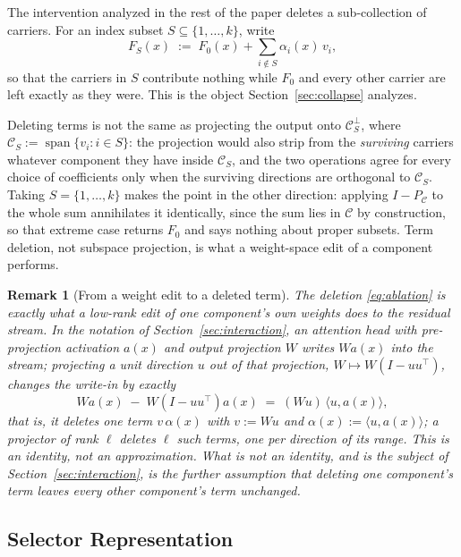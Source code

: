 \documentclass[11pt,a4paper]{article}
\newtheorem{remark}{Remark}
\begin{document}
The intervention analyzed in the rest of the paper deletes a sub-collection of
carriers. For an index subset $S\subseteq\{1,\dots,k\}$, write
\begin{equation}
\label{eq:ablation}
F_S(x) \;:=\; F_0(x) + \sum_{i\notin S} \alpha_i(x)\,v_i ,
\end{equation}
so that the carriers in $S$ contribute nothing while $F_0$ and every other
carrier are left exactly as they were. This is the object
Section~\ref{sec:collapse} analyzes.

Deleting terms is not the same as projecting the output onto
$\mathcal C_S^{\perp}$, where $\mathcal C_S:=\operatorname{span}\{v_i:i\in S\}$:
the projection would also strip from the \emph{surviving} carriers whatever
component they have inside $\mathcal C_S$, and the two operations agree for
every choice of coefficients only when the surviving directions are
orthogonal to $\mathcal C_S$. Taking
$S=\{1,\dots,k\}$ makes the point in the other direction: applying
$I-P_{\mathcal C}$ to the whole sum annihilates it identically, since the sum
lies in $\mathcal C$ by construction, so that extreme case returns $F_0$ and
says nothing about proper subsets. Term deletion, not subspace projection, is
what a weight-space edit of a component performs.

\begin{remark}[From a weight edit to a deleted term]
\label{rem:bridge}
The deletion \eqref{eq:ablation} is exactly what a low-rank edit of one
component's own weights does to the residual stream. In the notation of
Section~\ref{sec:interaction}, an attention head with pre-projection
activation $a(x)$ and output projection $W$ writes $W a(x)$ into the stream;
projecting a unit direction $u$ out of that projection,
$W\mapsto W(I-uu^{\top})$, changes the write-in by exactly
\[
W a(x) \;-\; W(I-uu^{\top})a(x) \;=\; (Wu)\,\langle u,a(x)\rangle,
\]
that is, it deletes one term $v\,\alpha(x)$ with $v:=Wu$ and
$\alpha(x):=\langle u,a(x)\rangle$; a projector of rank $\ell$ deletes $\ell$
such terms, one per direction of its range. This is an identity, not an
approximation. What is \emph{not} an identity, and is the subject of
Section~\ref{sec:interaction}, is the
further assumption that deleting one component's term leaves every other
component's term unchanged.
\end{remark}

\subsection{Selector Representation}
\end{document}
